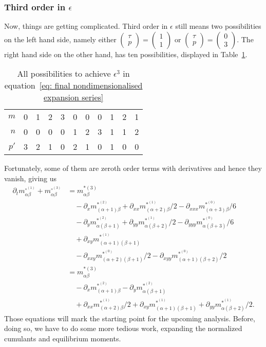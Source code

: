 \subsubsection{Third order in \texorpdfstring{$\epsilon$}{epsilon}}
\label{subs: Third order in epsilon}
Now, things are getting complicated.
Third order in $\epsilon$ still means two possibilities on the left hand side, namely either $\begin{pmatrix}\tau \\ p\end{pmatrix} = \begin{pmatrix} 1 \\ 1 \end{pmatrix}$ or $\begin{pmatrix}\tau \\ p\end{pmatrix} = \begin{pmatrix} 0 \\ 3 \end{pmatrix}$.
The right hand side on the other hand, has ten possibilities, displayed in Table~\ref{table: third order epsilon}.
\begin{table}[h]
  \centering
  \begin{tabular} {r || c | *{3}{c} | *{3}{c} | *{3}{c} }
    $m$  & 0 & 1 & 2 & 3 & 0 & 0 & 0 & 1 & 2 & 1 \\
    $n$  & 0 & 0 & 0 & 0 & 1 & 2 & 3 & 1 & 1 & 2 \\
    $p'$ & 3 & 2 & 1 & 0 & 2 & 1 & 0 & 1 & 0 & 0
  \end{tabular}
  \caption{All possibilities to achieve $\epsilon^3$ in equation~\eqref{eq: final nondimensionalised expansion series}}
\label{table: third order epsilon}
\end{table}
Fortunately, some of them are zeroth order terms with derivatives and hence they vanish, giving us
\begin{equation}
  \label{eq: third order in epsilon}
  \begin{aligned}
    \partial_t m_{\alpha\beta}^{\circ^{(1)}} + m_{\alpha\beta}^{\circ^{(3)}}
    & =  m_{\alpha\beta}^{*(3)} \\
    &\quad - \partial_x m_{(\alpha+1)\beta}^{*^{(2)}} + \partial_{xx} m_{(\alpha+2)\beta}^{*^{(1)}}/2 - \partial_{xxx} m_{(\alpha+3)\beta}^{*^{(0)}}/6 \\
    &\quad - \partial_y m_{\alpha(\beta+1)}^{*^{(2)}} + \partial_{yy} m_{\alpha(\beta+2)}^{*^{(1)}}/2 - \partial_{yyy} m_{\alpha(\beta+3)}^{*^{(0)}}/6 \\
    &\quad + \partial_{xy} m_{(\alpha+1)(\beta+1)}^{*^{(1)}} \\
    &\quad - \partial_{xxy} m_{(\alpha+2)(\beta+1)}^{*^{(0)}}/2 - \partial_{xyy} m_{(\alpha+1)(\beta+2)}^{*^{(0)}}/2 \\
    & =  m_{\alpha\beta}^{*(3)} \\
    &\quad - \partial_x m_{(\alpha+1)\beta}^{*^{(2)}} - \partial_y m_{\alpha(\beta+1)}^{*^{(2)}}  \\
    &\quad  + \partial_{xx} m_{(\alpha+2)\beta}^{*^{(1)}}/2 + \partial_{xy} m_{(\alpha+1)(\beta+1)}^{*^{(1)}} + \partial_{yy} m_{\alpha(\beta+2)}^{*^{(1)}}/2.
  \end{aligned}
\end{equation}
Those equations will mark the starting point for the upcoming analysis.
Before, doing so, we have to do some more tedious work, expanding the normalized cumulants and equilibrium moments.
